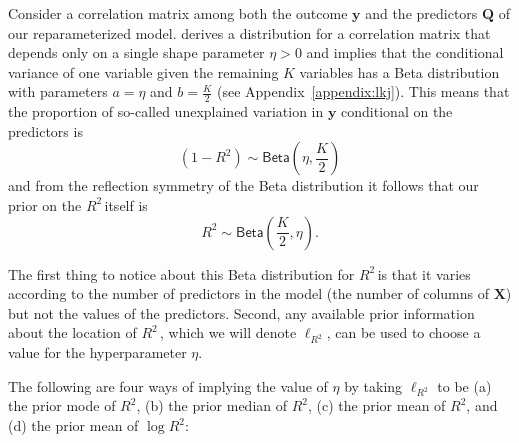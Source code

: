 \documentclass[11pt]{article}
\newcommand{\Rsq}{$R^2\,$}
\newcommand{\X}{\mathbf{X}}
\newcommand{\y}{\mathbf{y}}
\newcommand{\Q}{\mathbf{Q}}
\newcommand{\locRsq}{\ell_{R^2}}
\newcommand{\halfK}{\frac{K}{2}}
\newcommand{\Betadist}[2]{\mathsf{Beta}\left(#1,#2\right)}
\begin{document}
Consider a correlation matrix among both the outcome $\y$ and the predictors
$\Q$ of our reparameterized model.  derives a distribution for a
correlation matrix that depends only on a single shape parameter $\eta > 0$ and
implies that the conditional variance of one variable given the remaining $K$
variables has a Beta distribution with parameters $a = \eta$ and $b = \halfK$
(see Appendix~\ref{appendix:lkj}). This means that the proportion of so-called
unexplained variation in $\y$ conditional on the predictors is
%
$$(1 - R^2) \sim \Betadist{\eta}{\halfK}$$
%
and from the reflection symmetry of the Beta distribution it follows that our
prior on the \Rsq itself is
%
$$R^2 \sim \Betadist{\halfK}{\eta}.$$

The first thing to notice about this Beta distribution for \Rsq is that it
varies according to the number of predictors in the model (the number of columns
of $\X$) but not the values of the predictors. Second, any available prior
information about the location of \Rsq, which we will denote $\locRsq$, can be
used to choose a value for the hyperparameter $\eta$.

The following are four ways of implying the value of $\eta$ by taking $\locRsq$
to be (a) the prior mode of $R^2$, (b) the prior median of $R^2$, (c) the prior
mean of $R^2$, and (d) the prior mean of $\log{R^2}$:
\end{document}
